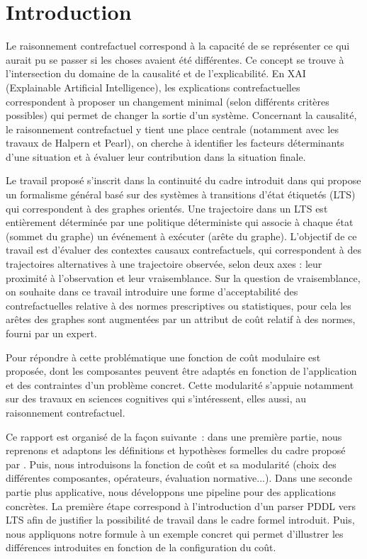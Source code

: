 \section{Introduction}

Le raisonnement contrefactuel correspond à la capacité de se représenter ce qui aurait pu se passer si les choses avaient été différentes. Ce concept se trouve à l'intersection du domaine de la causalité et de l'explicabilité. En XAI (Explainable Artificial Intelligence), les explications contrefactuelles correspondent à proposer un changement minimal (selon différents critères possibles) qui permet de changer la sortie d'un système. Concernant la causalité, le raisonnement contrefactuel y tient une place centrale (notamment avec les travaux de Halpern et Pearl), on cherche à identifier les facteurs déterminants d'une situation et à évaluer leur contribution dans la situation finale.

Le travail proposé s'inscrit dans la continuité du cadre introduit dans \cite{sarmiento_formalising_2025} qui propose un formalisme général basé sur des systèmes à transitions d'état étiquetés (LTS) qui correspondent à des graphes orientés. Une trajectoire dans un LTS est entièrement déterminée par une politique déterministe qui associe à chaque état (sommet du graphe) un événement à exécuter (arête du graphe). L'objectif de ce travail est d'évaluer des contextes causaux contrefactuels, qui correspondent à des trajectoires alternatives à une trajectoire observée, selon deux axes : leur proximité à l'observation et leur vraisemblance. Sur la question de vraisemblance, on souhaite dans ce travail introduire une forme d'acceptabilité des contrefactuelles relative à des normes prescriptives ou statistiques, pour cela les arêtes des graphes sont augmentées par un attribut de coût relatif à des normes, fourni par un expert.

Pour répondre à cette problématique une fonction de coût modulaire est proposée, dont les composantes peuvent être adaptés en fonction de l'application et des contraintes d'un problème concret. Cette modularité s'appuie notamment sur des travaux en sciences cognitives qui s'intéressent, elles aussi, au raisonnement contrefactuel. 

Ce rapport est organisé de la façon suivante : dans une première partie, nous reprenons et adaptons les définitions et hypothèses formelles du cadre proposé par \cite{sarmiento_formalising_2025}. Puis, nous introduisons la fonction de coût et sa modularité (choix des différentes composantes, opérateurs, évaluation normative...). Dans une seconde partie plus applicative, nous développons une pipeline pour des applications concrètes. La première étape correspond à l'introduction d'un parser PDDL vers LTS afin de justifier la possibilité de travail dans le cadre formel introduit. Puis, nous appliquons notre formule à un exemple concret qui permet d'illustrer les différences introduites en fonction  de la configuration du coût.

